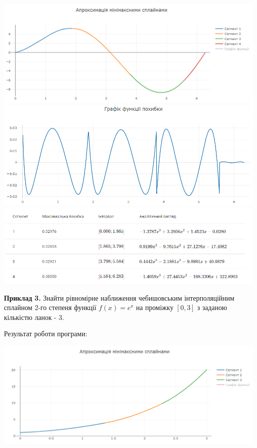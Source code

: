 \documentclass[ukrainian,14pt]{extarticle}
\begin{document}
\includegraphics[scale=0.65]{examples/2_approx.png}
\vspace{0.5cm}
\includegraphics[scale=0.65]{examples/2_error.png}
\vspace{0.5cm}
\includegraphics[scale=0.7]{examples/2_table.png}
\vspace{1cm}

\textbf{Приклад 3.} Знайти рівномірне наближення чебишовським інтерполяційним сплайном 2-го степеня функції $f(x)=e^x$ на проміжку $[0, 3]$ з заданою кількістю ланок - $3$.

Результат роботи програми:

\includegraphics[scale=0.65]{examples/3_approx.png}
\end{document}

